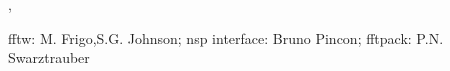 

\begin{manseealso}
  , 
\end{manseealso}

\begin{authors}
   fftw: M. Frigo,S.G. Johnson;  nsp interface: Bruno Pincon; fftpack: P.N. Swarztrauber
\end{authors}
